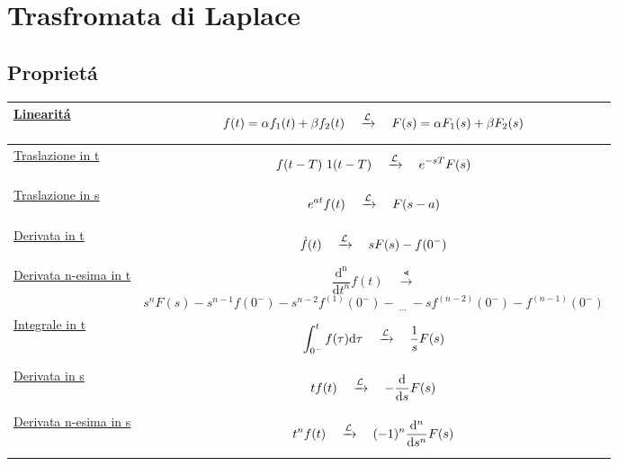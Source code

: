 \documentclass[../main.tex]{subfiles}
\begin{document}
	\section{Trasfromata di Laplace}
	\subsection{Propriet\'{a}}
	\label{subsec:prop_laplace}
	\begin{tabular}{|>{\centering\arraybackslash}m{1.5in}|>{\centering\arraybackslash}m{4.5in}|}
		\hline
		\hyperref[linear]{Linearit\'{a}} & $$f(t)=\alpha f_{1}(t) + \beta f_{2}(t) \quad \xrightarrow{\mathcal{L}} \quad F(s)=\alpha F_{1}(s) + \beta F_{2}(s)$$\\
		\hline
		\hyperref[trasl_t]{Traslazione in t} & $$ \Lapl{f(t-T)\ 1(t-T)}{e^{-sT}F(s)} $$\\
		\hline
		\hyperref[trasl_s]{Traslazione in s} & $$ e^{at}f(t) \quad \xrightarrow{\mathcal{L}} \quad F(s-a) $$\\
		\hline
		\hyperref[deriv_t]{Derivata in t} & $$ \dot{f}(t) \quad \xrightarrow{\mathcal{L}} \quad sF(s)-f(0^{-}) $$\\
		\hline
		\hyperref[deriv_n_t]{Derivata n-esima in t} & \parbox{4.5in}{$$ \frac{\mathrm{d^n}}{\mathrm{d}t^n}f(t) \quad \xrightarrow{\Lt} $$\\$$ s^n F(s) - s^{n-1} f(0^{-}) - s^{n-2} f^{(1)}(0^{-}) -\ _{\dots}\ - s f^{(n-2)}(0^{-}) - f^{(n-1)}(0^{-}) $$} \\
		\hline
		\hyperref[int_t]{Integrale in t} & $$ \int_{0^{-}}^{t} f(\tau) \mathrm{d}\tau \quad \xrightarrow{\mathcal{L}} \quad \frac{1}{s} F(s) $$\\
		\hline
		\hyperref[deriv_s]{Derivata in s} & $$ t f(t) \quad \xrightarrow{\mathcal{L}} \quad - \frac{\mathrm{d}}{\mathrm{d}s} F(s) $$\\
		\hline
		\hyperref[deriv_s]{Derivata n-esima in s} & $$ t^n f(t) \quad \xrightarrow{\mathcal{L}} \quad (-1)^n \frac{\mathrm{d}^n}{\mathrm{d}s^n} F(s) $$\\
		\hline
	\end{tabular}
\end{document}
